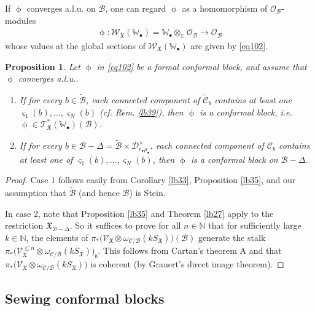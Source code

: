 \documentclass[12pt,a4paper,notitlepage]{report}
\theoremstyle{definition}
\theoremstyle{plain}
\newtheorem{pp}[df]{Proposition}
\newcommand{\fk}{\mathfrak}
\newcommand{\mc}{\mathcal}
\newcommand{\wtd}{\widetilde}
\newcommand{\scr}{\mathscr}
\newcommand{\sgm}{\varsigma}
\newcommand{\SX}{S_{\fk X}}
\newcommand{\blt}{\bullet}
\newcommand{\Wbb}{\mathbb W}
\newcommand{\Cbb}{\mathbb C}
\newcommand{\Nbb}{\mathbb N}
\numberwithin{equation}{section}
\begin{document}
If $\upphi$ converges a.l.u. on $\mc B$, one can regard $\upphi$ as a homomorphism of $\scr O_{\mc B}$-modules
\begin{align*}
\upphi:\scr W_{\fk X}(\Wbb_\blt)=\Wbb_\blt\otimes_\Cbb\scr O_{\mc B}\rightarrow\scr O_{\mc B}
\end{align*}
whose values at the global sections of $\scr W_{\fk X}(\Wbb_\blt)$  are given by \eqref{eq102}.

\begin{pp}\label{lb43}
Let $\upphi$ in \eqref{eq102} be a formal conformal block, and assume that $\upphi$ converges a.l.u..
\begin{enumerate}
\item If for every $b\in\wtd{\mc B}$, each connected component of  $\wtd{\mc C}_b$ contains at least one $\sgm_1(b),\dots,\sgm_N(b)$ (cf. Rem. \ref{lb39}), then  $\upphi$ is a conformal block, i.e. $\upphi\in\scr T_{\fk X}^*(\Wbb_\blt)(\mc B)$.
\item If  for every $b\in\mc B-\Delta=\wtd{\mc B}\times\mc D_{r_\blt\rho_\blt}^\times$, each connected component of $\mc C_b$ contains at least one of $\sgm_1(b),\dots,\sgm_N(b)$, then $\upphi$ is a conformal block on $\mc B-\Delta$.
\end{enumerate}

\end{pp}


\begin{proof}
Case 1 follows easily from Corollary \ref{lb33}, Proposition \ref{lb35}, and our assumption that $\wtd{\mc B}$ (and hence $\mc B$) is Stein.

In case 2, note that Proposition \ref{lb35} and Theorem \ref{lb27} apply to the restriction $\fk X_{\mc B-\Delta}$. So it suffices to prove for all $n\in\Nbb$ that for sufficiently large $k\in\Nbb$, the elements of $\pi_*\big(\scr V_{\fk X}\otimes\omega_{\mc C/\mc B}(k S_{\fk X})\big)(\mc B)$  generate the stalk $\pi_*\big(\scr V_{\fk X}^{\leq n}\otimes\omega_{\mc C/\mc B}(k\SX)\big)_b$. This follows from Cartan's theorem A and that $\pi_*\big(\scr V_{\fk X}\otimes\omega_{\mc C/\mc B}(k S_{\fk X})\big)$ is coherent (by Grauert's direct image theorem).
\end{proof}







\subsection*{Sewing conformal blocks}
\end{document}
